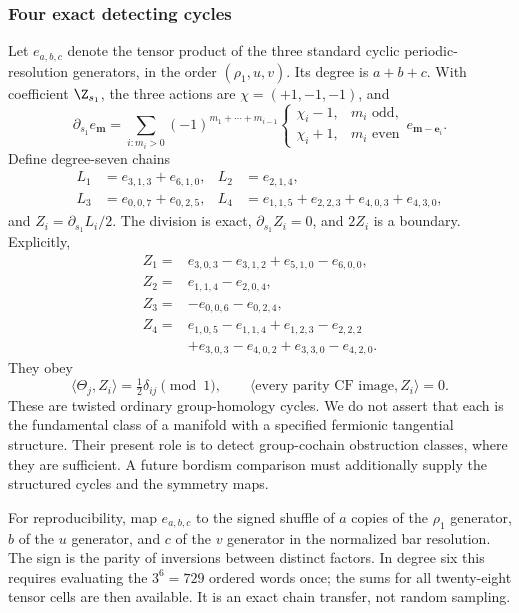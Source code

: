 \subsubsection{Four exact detecting cycles}
Let $e_{a,b,c}$ denote the tensor product of the three standard cyclic periodic-resolution generators, in the order $({\rho_1},u,v)$. Its degree is $a+b+c$. With coefficient $\Z_{s_1}$, the three actions are $\chi=(+1,-1,-1)$, and
\begin{equation}\label{eq:periodicboundary04}
\partial_{s_1} e_{\boldsymbol m}
=\sum_{i:m_i>0}(-1)^{m_1+\cdots+m_{i-1}}
\begin{cases}
\chi_i-1,&m_i\text{ odd},\\
\chi_i+1,&m_i\text{ even}
\end{cases}
 e_{\boldsymbol m-\boldsymbol e_i}.
\end{equation}
Define degree-seven chains
\begin{align}\label{eq:detectorL04}
L_1&=e_{3,1,3}+e_{6,1,0},&
L_2&=e_{2,1,4},\nonumber\\
L_3&=e_{0,0,7}+e_{0,2,5},&
L_4&=e_{1,1,5}+e_{2,2,3}+e_{4,0,3}+e_{4,3,0},
\end{align}
and $Z_i=\partial_{s_1}L_i/2$. The division is exact, $\partial_{s_1}Z_i=0$, and $2Z_i$ is a boundary. Explicitly,
\begin{align}\label{eq:detectorZ04}
Z_1={}&e_{3,0,3}-e_{3,1,2}+e_{5,1,0}-e_{6,0,0},\nonumber\\
Z_2={}&e_{1,1,4}-e_{2,0,4},\nonumber\\
Z_3={}&-e_{0,0,6}-e_{0,2,4},\\
Z_4={}&e_{1,0,5}-e_{1,1,4}+e_{1,2,3}-e_{2,2,2}\nonumber\\
&+e_{3,0,3}-e_{4,0,2}+e_{3,3,0}-e_{4,2,0}.\nonumber
\end{align}
They obey
\begin{equation}\label{eq:detectmatrix04}
\boxed{\langle\Theta_j,Z_i\rangle=\tfrac12\delta_{ij}\pmod1,\qquad
\langle\text{every parity CF image},Z_i\rangle=0.}
\end{equation}
These are twisted ordinary group-homology cycles. We do not assert that each is the fundamental class of a manifold with a specified fermionic tangential structure. Their present role is to detect group-cochain obstruction classes, where they are sufficient. A future bordism comparison must additionally supply the structured cycles and the symmetry maps.

For reproducibility, map $e_{a,b,c}$ to the signed shuffle of $a$ copies of the ${\rho_1}$ generator, $b$ of the $u$ generator, and $c$ of the $v$ generator in the normalized bar resolution. The sign is the parity of inversions between distinct factors. In degree six this requires evaluating the $3^6=729$ ordered words once; the sums for all twenty-eight tensor cells are then available. It is an exact chain transfer, not random sampling.


